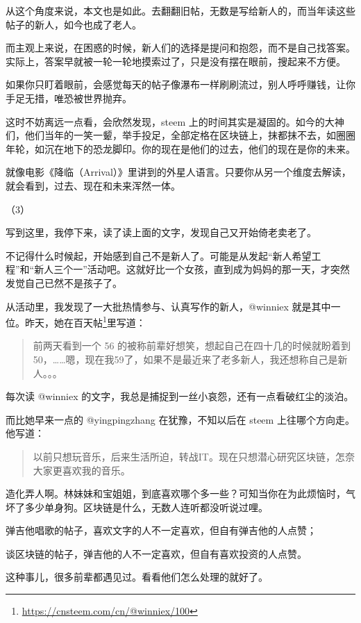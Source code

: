 \documentclass[]{ctexbook}
\renewcommand{\href}[2]{#2\footnote{\url{#1}}}
\begin{document}
从这个角度来说，本文也是如此。去翻翻旧帖，无数是写给新人的，而当年读这些帖子的新人，如今也成了老人。

而主观上来说，在困惑的时候，新人们的选择是提问和抱怨，而不是自己找答案。实际上，答案早就被一轮一轮地摸索过了，只是没有摆在眼前，搜起来不方便。

如果你只盯着眼前，会感觉每天的帖子像瀑布一样刷刷流过，别人呼呼赚钱，让你手足无措，唯恐被世界抛弃。

这时不妨离远一点看，会欣然发现，steem 上的时间其实是凝固的。如今的大神们，他们当年的一笑一颦，举手投足，全部定格在区块链上，抹都抹不去，如圈圈年轮，如沉在地下的恐龙脚印。你的现在是他们的过去，他们的现在是你的未来。

就像电影《降临（Arrival）》里讲到的外星人语言。只要你从另一个维度去解读，就会看到，过去、现在和未来浑然一体。

（3）

写到这里，我停下来，读了读上面的文字，发现自己又开始倚老卖老了。

不记得什么时候起，开始感到自己不是新人了。可能是从发起``新人希望工程''和``新人三个一''活动吧。这就好比一个女孩，直到成为妈妈的那一天，才突然发觉自己已然不是孩子了。

从活动里，我发现了一大批热情参与、认真写作的新人，@winniex 就是其中一位。昨天，她在\href{https://cnsteem.com/cn/@winniex/100}{百天帖}里写道：

\begin{quote}
前两天看到一个 56 的被称前辈好想笑，想起自己在四十几的时候就盼着到 50，\ldots{}\ldots{}嗯，现在我59了，如果不是最近来了老多新人，我还想称自己是新人。。。
\end{quote}

每次读 @winniex 的文字，我总是捕捉到一丝小哀怨，还有一点看破红尘的淡泊。

而比她早来一点的 @yingpingzhang 在犹豫，不知以后在 steem 上往哪个方向走。他写道：

\begin{quote}
以前只想玩音乐，后来生活所迫，转战IT。现在只想潜心研究区块链，怎奈大家更喜欢我的音乐。
\end{quote}

造化弄人啊。林妹妹和宝姐姐，到底喜欢哪个多一些？可知当你在为此烦恼时，气坏了多少单身狗。区块链是什么，无数人连听都没听说过哩。

弹吉他唱歌的帖子，喜欢文字的人不一定喜欢，但自有弹吉他的人点赞；

谈区块链的帖子，弹吉他的人不一定喜欢，但自有喜欢投资的人点赞。

这种事儿，很多前辈都遇见过。看看他们怎么处理的就好了。
\end{document}
